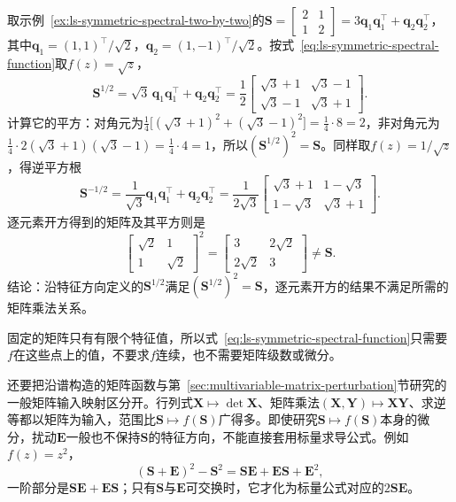 \begin{example}[矩阵平方根与逐元素开方]
\label{ex:ls-matrix-square-root-two-by-two}
取示例~\ref{ex:ls-symmetric-spectral-two-by-two}的$\bm S=\left[\begin{smallmatrix}2&1\\1&2\end{smallmatrix}\right]=3\bm q_1\bm q_1^\top+\bm q_2\bm q_2^\top$，其中$\bm q_1=(1,1)^\top/\sqrt2$，$\bm q_2=(1,-1)^\top/\sqrt2$。按式~\eqref{eq:ls-symmetric-spectral-function}取$f(z)=\sqrt z$，
\[
 \bm S^{1/2}
 =\sqrt3\,\bm q_1\bm q_1^\top+\bm q_2\bm q_2^\top
 =\frac12\begin{bmatrix}\sqrt3+1&\sqrt3-1\\\sqrt3-1&\sqrt3+1\end{bmatrix}.
\]
计算它的平方：对角元为$\tfrac14\bigl[(\sqrt3+1)^2+(\sqrt3-1)^2\bigr]=\tfrac14\cdot8=2$，非对角元为$\tfrac14\cdot2(\sqrt3+1)(\sqrt3-1)=\tfrac14\cdot4=1$，所以$(\bm S^{1/2})^2=\bm S$。同样取$f(z)=1/\sqrt z$，得逆平方根
\[
 \bm S^{-1/2}
 =\frac1{\sqrt3}\bm q_1\bm q_1^\top+\bm q_2\bm q_2^\top
 =\frac1{2\sqrt3}\begin{bmatrix}\sqrt3+1&1-\sqrt3\\1-\sqrt3&\sqrt3+1\end{bmatrix}.
\]
逐元素开方得到的矩阵及其平方则是
\[
 \begin{bmatrix}\sqrt2&1\\1&\sqrt2\end{bmatrix}^2
 =\begin{bmatrix}3&2\sqrt2\\2\sqrt2&3\end{bmatrix}\neq\bm S .
\]
结论：沿特征方向定义的$\bm S^{1/2}$满足$(\bm S^{1/2})^2=\bm S$，逐元素开方的结果不满足所需的矩阵乘法关系。
\end{example}

固定的矩阵只有有限个特征值，所以式~\eqref{eq:ls-symmetric-spectral-function}只需要$f$在这些点上的值，不要求$f$连续，也不需要矩阵级数或微分。

还要把沿谱构造的矩阵函数与第~\ref{sec:multivariable-matrix-perturbation}节研究的一般矩阵输入映射区分开。行列式$\bm X\mapsto\det\bm X$、矩阵乘法$(\bm X,\bm Y)\mapsto\bm X\bm Y$、求逆等都以矩阵为输入，范围比$\bm S\mapsto f(\bm S)$广得多。即使研究$\bm S\mapsto f(\bm S)$本身的微分，扰动$\bm E$一般也不保持$\bm S$的特征方向，不能直接套用标量求导公式。例如$f(z)=z^2$，
\[
 (\bm S+\bm E)^2-\bm S^2=\bm S\bm E+\bm E\bm S+\bm E^2 ,
\]
一阶部分是$\bm S\bm E+\bm E\bm S$；只有$\bm S$与$\bm E$可交换时，它才化为标量公式对应的$2\bm S\bm E$。

